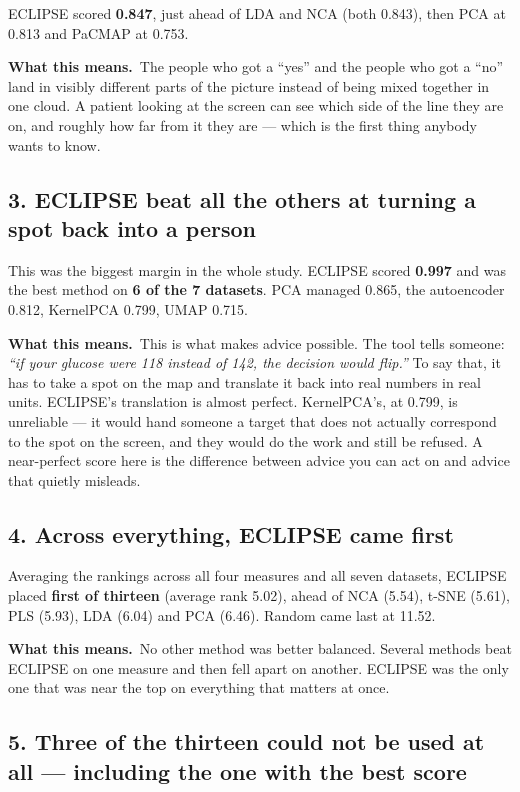 \documentclass[11pt]{article}
\newcommand{\hl}[1]{\textcolor{accent}{\textbf{#1}}}
\newcommand{\means}{\textbf{\textcolor{accent}{What this means.}}\ }
\begin{document}
ECLIPSE scored \hl{0.847}, just ahead of LDA and NCA (both 0.843), then PCA at 0.813 and
PaCMAP at 0.753.

\means The people who got a ``yes'' and the people who got a ``no'' land in visibly
different parts of the picture instead of being mixed together in one cloud. A patient
looking at the screen can see which side of the line they are on, and roughly how far
from it they are --- which is the first thing anybody wants to know.

\subsection*{3. ECLIPSE beat all the others at turning a spot back into a person}

This was the biggest margin in the whole study. ECLIPSE scored \hl{0.997} and was the
best method on \hl{6 of the 7 datasets}. PCA managed 0.865, the autoencoder 0.812,
KernelPCA 0.799, UMAP 0.715.

\means This is what makes advice possible. The tool tells someone: \emph{``if your
glucose were 118 instead of 142, the decision would flip.''} To say that, it has to take
a spot on the map and translate it back into real numbers in real units. ECLIPSE's
translation is almost perfect. KernelPCA's, at 0.799, is unreliable --- it would hand
someone a target that does not actually correspond to the spot on the screen, and they
would do the work and still be refused. A near-perfect score here is the difference
between advice you can act on and advice that quietly misleads.

\subsection*{4. Across everything, ECLIPSE came first}

Averaging the rankings across all four measures and all seven datasets, ECLIPSE placed
\hl{first of thirteen} (average rank 5.02), ahead of NCA (5.54), t-SNE (5.61), PLS
(5.93), LDA (6.04) and PCA (6.46). Random came last at 11.52.

\means No other method was better balanced. Several methods beat ECLIPSE on one measure
and then fell apart on another. ECLIPSE was the only one that was near the top on
everything that matters at once.

\subsection*{5. Three of the thirteen could not be used at all --- including the one
with the best score}
\end{document}
